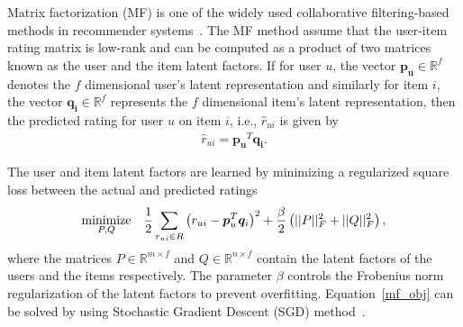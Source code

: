 Matrix factorization (MF) is one of the widely used collaborative
filtering-based methods 
in recommender systems~\cite{hu2008collaborative,koren2008factorization,koren2010collaborative,koren2009matrix}. 
The  MF method assume that the
user-item rating matrix is low-rank and can be computed as a product of two
matrices known as the user and the item latent factors. 
If for user $u$, the vector $\bm{p_u} \in \mathbb{R}^f$ denotes the $f$ dimensional
user's latent representation and similarly for item $i$, the vector 
$\bm{q_i} \in \mathbb{R}^f$ represents the $f$ dimensional item's latent
representation, then the
predicted rating for user $u$ on item $i$, i.e., $\hat{r}_{ui}$ is given by
%
\begin{equation} \label{mf_eq}
  \begin{split}
    \hat{r}_{ui} = \bm{p_u}^T\bm{q_i}.
  \end{split}
\end{equation}


The user and item latent factors are learned by minimizing a regularized
square loss between the actual and predicted ratings 
\begin{equation} \label{mf_eq}
  \begin{aligned}
    \operatornamewithlimits{minimize}_{P, Q} & &\frac{1}{2}\sum_{r_{ui} \in R}
    \left(r_{ui} - \bm{p}_u^T \bm{q}_i \right)^2+ \frac{\beta}{2}
    \left(||P||_F^2 + ||Q||_F^2 \right),
  \end{aligned}
\end{equation}
where the matrices $P \in \mathbb{R}^{m \times f}$ and $Q \in\mathbb{R}^{n \times f}$ 
contain the latent factors of the users and the items
respectively. The parameter $\beta$ controls the Frobenius norm regularization
of the latent factors to prevent overfitting. 
Equation~\ref{mf_obj} can be solved by using Stochastic Gradient Descent (SGD)
method~\cite{koren2009matrix}.

\iffalse
Since naive SGD is not easy to parallelize and does not scale for large datasets, a
variety of methods have been proposed to parallelize
SGD~\cite{gemulla2011large,recht2011hogwild,recht2013parallel}.
Alternating Least Squares (ALS)~\cite{zhou2008large} and CCD++~\cite{yu2012scalable} 
can also be used for matrix factorization, and unlike SGD these
schemes are inherently suitable for parallelization.
\fi
